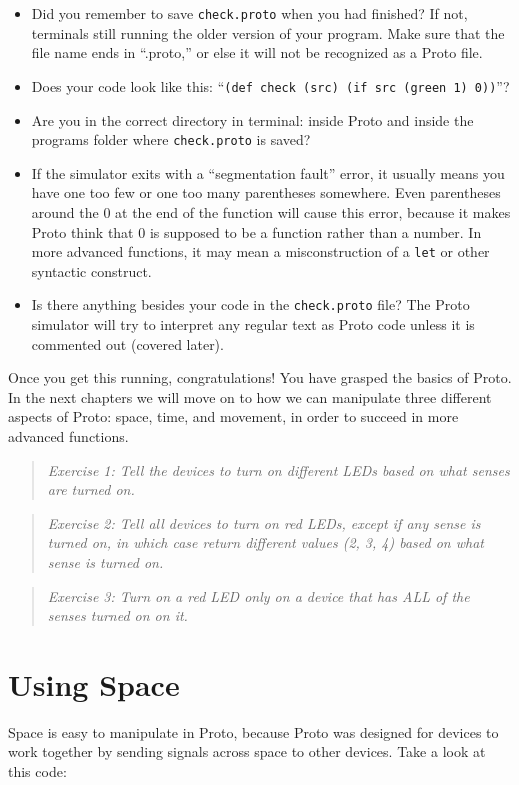 \documentclass{article}
\newcommand\problem[1]{\begin{quote}{\em #1}\end{quote}}
\newcommand\var[1]{{\tt #1}}
\newcommand\qvar[1]{``{\tt #1}''}
\begin{document}
\begin{itemize}
\item Did you remember to save \var{check.proto} when you had
  finished? If not, terminals still running the older version of your
  program. Make sure that the file name ends in ``.proto,'' or else it
  will not be recognized as a Proto file.
\item Does your code look like this: \qvar{(def check (src) (if src
    (green 1) 0))}?
\item Are you in the correct directory in terminal: inside Proto and
  inside the programs folder where \var{check.proto} is saved?
\item If the simulator exits with a ``segmentation fault'' error, it
  usually means you have one too few or one too many parentheses
  somewhere.  Even parentheses around the 0 at the end of the function
  will cause this error, because it makes Proto think that 0 is
  supposed to be a function rather than a number.  In more advanced
  functions, it may mean a misconstruction of a \var{let} or other
  syntactic construct.
\item Is there anything besides your code in the \var{check.proto}
  file? The Proto simulator will try to interpret any regular text as
  Proto code unless it is commented out (covered later).
\end{itemize}

Once you get this running, congratulations! You have grasped the
basics of Proto. In the next chapters we will move on to how we can
manipulate three different aspects of Proto: space, time, and
movement, in order to succeed in more advanced functions.

\problem{Exercise 1: Tell the devices to turn on different LEDs based
  on what senses are turned on.}

\problem{Exercise 2: Tell all devices to turn on red LEDs, except if
  any sense is turned on, in which case return different values (2, 3,
  4) based on what sense is turned on.}

\problem{Exercise 3: Turn on a red LED only on a device that has ALL
  of the senses turned on on it.}


\section{Using Space}

Space is easy to manipulate in Proto, because Proto was designed for
devices to work together by sending signals across space to other
devices.  Take a look at this code:
\end{document}
